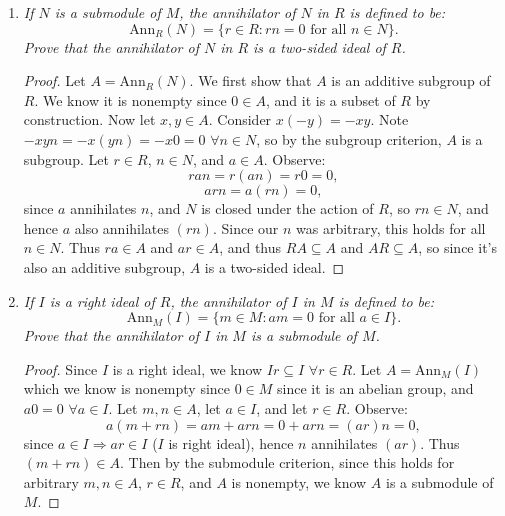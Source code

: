 \documentclass[12pt]{amsbook}
\theoremstyle{plain}
\numberwithin{section}{chapter}
\numberwithin{equation}{chapter}
\theoremstyle{definition}
\theoremstyle{remark}
\newcommand{\sub}{\subseteq}
\begin{document}
\begin{enumerate}[label=\arabic*.]
\begin{enumerate}
\vspace{3mm}
\item \textit{If $R$ has zero divisors, show that every nonzero $R$-module has nonzero torsion elements. }

\begin{proof}
Suppose $R$ has zero divisors. So $\exists r,s \in R$ nonzero such that $rs = 0$. Now let $M$ be an $R$-module. We wish to show that $\exists m \in M$ s.t. $m \neq 0$, $tm = 0$ for some nonzero $t \in R$. Let $n \in M$ s.t. $n \neq 0$. Now consider $sn \in M$ and $r \in R$. Now note that $rsn = 0$ and that $r$ and $sn$ are both nonzero, so $sn$ is a nonzero torsion element. 
\end{proof}
\end{enumerate}
\vspace{3mm}
\item \textit{If $N$ is a submodule of $M$, the annihilator of $N$ in $R$ is defined to be: 
$$
\text{Ann}_R(N) = \{r \in R:rn = 0 \text{ for all }n \in N\}.
$$
Prove that the annihilator of $N$ in $R$ is a two-sided ideal of $R$. 
}

\begin{proof}
Let $A = \text{Ann}_R(N)$. We first show that $A$ is an additive subgroup of $R$. We know it is nonempty since $0 \in A$, and it is a subset of $R$ by construction. Now let $x,y \in A$. Consider $x(-y) = -xy$. Note $-xyn = -x(yn) = -x0 = 0$ $\forall n \in N$, so by the subgroup criterion, $A$ is a subgroup. Let $r \in R$, $n \in N$, and $a \in A$. Observe:
$$
ran = r(an) = r0 = 0,
$$
$$
arn = a(rn) = 0,
$$
since $a$ annihilates $n$, and $N$ is closed under the action of $R$, so $rn \in N$, and hence $a$ also annihilates $(rn)$. Since our $n$ was arbitrary, this holds for all $n \in N$. Thus $ra \in A$ and $ar \in A$, and thus $RA \sub A$ and $AR \sub A$, so since it's also an additive subgroup, $A$ is a two-sided ideal. 
\end{proof}

\vspace{3mm}

\item \textit{If $I$ is a right ideal of $R$, the annihilator of $I$ in $M$ is defined to be: 
$$
\text{Ann}_M(I) = \{m \in M:am = 0 \text{ for all }a \in I\}.
$$
Prove that the annihilator of $I$ in $M$ is a submodule of $M$. 
}
\begin{proof}
Since $I$ is a right ideal, we know $Ir \sub I$ $\forall r \in R$. Let $A = \text{Ann}_M(I)$ which we know is nonempty since $0 \in M$ since it is an abelian group, and $a0 = 0$ $\forall a \in I$. Let $m,n \in A$, let $a \in I$, and let $r \in R$. Observe: 
$$
a(m + rn) = am + arn = 0 + arn = (ar)n = 0,
$$
since $a \in I \Rightarrow ar \in I$ ($I$ is right ideal), hence $n$ annihilates $(ar)$. Thus $(m + rn) \in A$. Then by the submodule criterion, since this holds for arbitrary $m,n  \in A$, $r \in R$, and $A$ is nonempty, we know $A$ is a submodule of $M$. 
\end{proof}


\end{enumerate}
\end{document}
